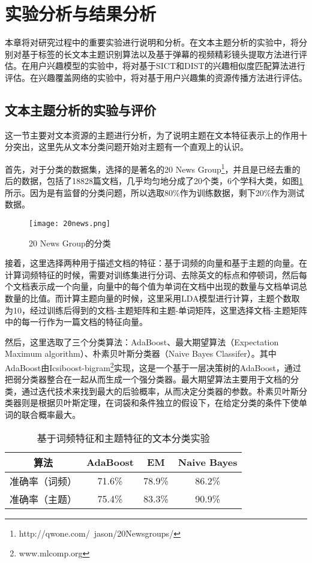 \section{实验分析与结果分析}
本章将对研究过程中的重要实验进行说明和分析。在文本主题分析的实验中，将分别对基于标签的长文本主题识别算法以及基于弹幕的视频精彩镜头提取方法进行评估。在用户兴趣模型的实验中，将对基于SICT和DIST的兴趣相似度匹配算法进行评估。在兴趣覆盖网络的实验中，将对基于用户兴趣集的资源传播方法进行评估。

\subsection{文本主题分析的实验与评价}
这一节主要对文本资源的主题进行分析，为了说明主题在文本特征表示上的作用十分突出，这里先从文本分类问题开始对主题有一个直观上的认识。

首先，对于分类的数据集，选择的是著名的20 News Group\footnote{http://qwone.com/~jason/20Newsgroups/}，并且是已经去重的后的数据，包括了18828篇文档，几乎均匀地分成了20个类，6个学科大类，如图\ref{fig:20news}所示。因为是有监督的分类问题，所以选取80\%作为训练数据，剩下20\%作为测试数据。
\begin{figure}[!ht]
\centering
\texttt{[image: 20news.png]}
\caption{20 News Group的分类}
\label{fig:20news}
\end{figure}

接着，这里选择两种用于描述文档的特征：基于词频的向量和基于主题的向量。在计算词频特征的时候，需要对训练集进行分词、去除英文的标点和停顿词，然后每个文档表示成一个向量，向量中的每个值为单词在文档中出现的数量与文档单词总数量的比值。而计算主题向量的时候，这里采用LDA模型进行计算，主题个数取为10，经过训练后得到的文档-主题矩阵和主题-单词矩阵，这里选择文档-主题矩阵中的每一行作为一篇文档的特征向量。

然后，这里选取了三个分类算法：AdaBoost、最大期望算法（Expectation Maximum algorithm）、朴素贝叶斯分类器（Naive Bayes Classifer）。其中AdaBoost由Icsiboost-bigram\footnote{www.mlcomp.org}实现，这是一个基于一层决策树的AdaBoost，通过把弱分类器整合在一起从而生成一个强分类器。最大期望算法主要用于文档的分类，通过迭代技术来找到最大的后验概率，从而决定分类器的参数。朴素贝叶斯分类器则是根据贝叶斯定理，在词袋和条件独立的假设下，在给定分类的条件下使单词的联合概率最大。

\begin{table}[!hbt]
  \centering
  \caption{基于词频特征和主题特征的文本分类实验}
  \begin{tabular}{|c|c|c|c|}
    \hline
    算法 & AdaBoost & EM & Naive Bayes \\
    \hline
    准确率（词频）& 71.6\% & 78.9\% & 86.2\% \\
    \hline
    准确率（主题）& 75.4\% & 83.3\% & 90.9\% \\
    \hline
  \end{tabular}
  \label{tbl:classify}
\end{table}

